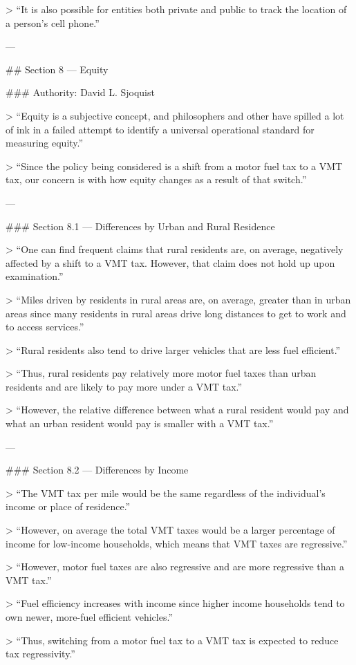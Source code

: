 > “It is also possible for entities both private and public to track the location of a person’s cell phone.”

---

## Section 8 — Equity

### Authority: David L. Sjoquist

> “Equity is a subjective concept, and philosophers and other have spilled a lot of ink in a failed attempt to identify a universal operational standard for measuring equity.”

> “Since the policy being considered is a shift from a motor fuel tax to a VMT tax, our concern is with how equity changes as a result of that switch.”

---

### Section 8.1 — Differences by Urban and Rural Residence

> “One can find frequent claims that rural residents are, on average, negatively affected by a shift to a VMT tax. However, that claim does not hold up upon examination.”

> “Miles driven by residents in rural areas are, on average, greater than in urban areas since many residents in rural areas drive long distances to get to work and to access services.”

> “Rural residents also tend to drive larger vehicles that are less fuel efficient.”

> “Thus, rural residents pay relatively more motor fuel taxes than urban residents and are likely to pay more under a VMT tax.”

> “However, the relative difference between what a rural resident would pay and what an urban resident would pay is smaller with a VMT tax.”

---

### Section 8.2 — Differences by Income

> “The VMT tax per mile would be the same regardless of the individual’s income or place of residence.”

> “However, on average the total VMT taxes would be a larger percentage of income for low-income households, which means that VMT taxes are regressive.”

> “However, motor fuel taxes are also regressive and are more regressive than a VMT tax.”

> “Fuel efficiency increases with income since higher income households tend to own newer, more-fuel efficient vehicles.”

> “Thus, switching from a motor fuel tax to a VMT tax is expected to reduce tax regressivity.”

